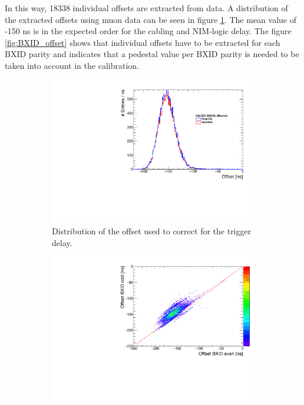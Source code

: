In this way, 18338 individual offsets are extracted from data. A distribution of the extracted offsets using muon data can be seen in figure \ref{fig:offset_trigger_distribution}. The mean value of -150 ns is in the expected order for the cabling and NIM-logic delay. The figure \ref{fig:BXID_offset} shows that individual offsets have to be extracted for each BXID parity and indicates that a pedestal value per BXID parity is needed to be taken into account in the calibration.

\begin{figure}[htbp!]
	\begin{subfigure}[t]{0.5\textwidth}
		\centering
		\includegraphics[width=1\textwidth]{../Thesis_Plots/Timing/Muons/Plots/ExtractedOffsets.pdf}
		\caption{Distribution of the offset used to correct for the trigger delay.}\label{fig:offset_trigger_distribution}
	\end{subfigure}
	\hfill
	\begin{subfigure}[t]{0.5\textwidth}
		\centering
		\includegraphics[width=1\textwidth]{../Thesis_Plots/Timing/Muons/Plots/CorrelationOffsets_BXID.pdf}

\end{subfigure}
\end{figure}
